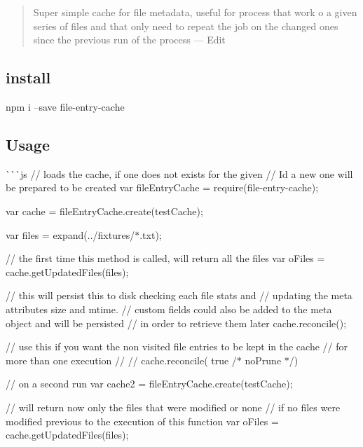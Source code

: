 \begin{quote}
Super simple cache for file metadata, useful for process that work o a given series of files and that only need to repeat the job on the changed ones since the previous run of the process — Edit \end{quote}


\href{https://npmjs.org/package/file-entry-cache}{\tt } \href{https://travis-ci.org/royriojas/file-entry-cache}{\tt }

\subsection*{install}


\begin{DoxyCode}
npm i --save file-entry-cache
\end{DoxyCode}


\subsection*{Usage}

\`{}\`{}\`{}js // loads the cache, if one does not exists for the given // Id a new one will be prepared to be created var file\+Entry\+Cache = require(\textquotesingle{}file-\/entry-\/cache\textquotesingle{});

var cache = file\+Entry\+Cache.\+create(\textquotesingle{}test\+Cache\textquotesingle{});

var files = expand(\textquotesingle{}../fixtures/$\ast$.txt\textquotesingle{});

// the first time this method is called, will return all the files var o\+Files = cache.\+get\+Updated\+Files(files);

// this will persist this to disk checking each file stats and // updating the meta attributes {\ttfamily size} and {\ttfamily mtime}. // custom fields could also be added to the meta object and will be persisted // in order to retrieve them later cache.\+reconcile();

// use this if you want the non visited file entries to be kept in the cache // for more than one execution // // cache.\+reconcile( true /$\ast$ no\+Prune $\ast$/)

// on a second run var cache2 = file\+Entry\+Cache.\+create(\textquotesingle{}test\+Cache\textquotesingle{});

// will return now only the files that were modified or none // if no files were modified previous to the execution of this function var o\+Files = cache.\+get\+Updated\+Files(files);

